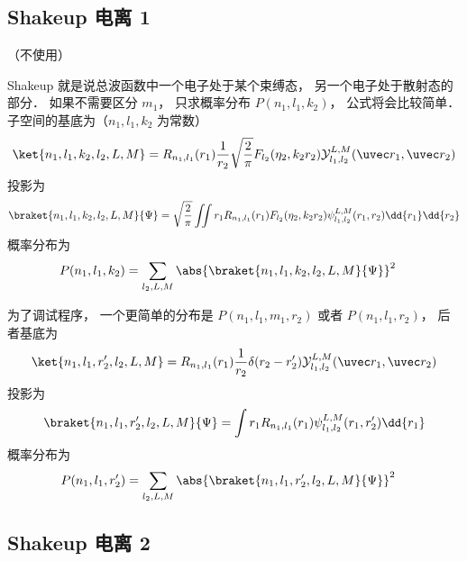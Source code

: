 \subsection{Shakeup 电离 1}
（不使用）

Shakeup 就是说总波函数中一个电子处于某个束缚态， 另一个电子处于散射态的部分． 如果不需要区分 $m_1$， 只求概率分布 $P(n_1, l_1, k_2)$， 公式将会比较简单． 子空间的基底为（$n_1, l_1, k_2$ 为常数）
\begin{equation}
\ket{n_1, l_1, k_2, l_2, L, M} = R_{n_1,l_1}(r_1) \frac{1}{r_2}\sqrt{\frac{2}{\pi}} F_{l_2}(\eta_2, k_2 r_2) \mathcal{Y}_{l_1, l_2}^{L, M}(\uvec r_1, \uvec r_2)
\end{equation}
投影为
\begin{equation}
\braket{n_1, l_1, k_2, l_2, L, M}{\Psi} = \sqrt{\frac{2}{\pi}} \iint r_1 R_{n_1,l_1}(r_1) F_{l_2}(\eta_2, k_2 r_2) \psi_{l_1, l_2}^{L, M}(r_1, r_2) \dd{r_1} \dd{r_2}
\end{equation}
概率分布为
\begin{equation}
\begin{aligned}
P(n_1, l_1, k_2) &= \sum_{l_2, L, M} \abs{\braket{n_1, l_1, k_2, l_2, L, M}{\Psi}}^2
\end{aligned}
\end{equation}

为了调试程序， 一个更简单的分布是 $P(n_1, l_1, m_1, r_2)$ 或者 $P(n_1, l_1, r_2)$， 后者基底为
\begin{equation}
\ket{n_1, l_1, r_2', l_2, L, M} = R_{n_1,l_1}(r_1) \frac{1}{r_2}\delta(r_2 - r_2') \mathcal{Y}_{l_1, l_2}^{L, M}(\uvec r_1, \uvec r_2)
\end{equation}
投影为
\begin{equation}
\braket{n_1, l_1, r_2', l_2, L, M}{\Psi} = \int r_1 R_{n_1,l_1}(r_1) \psi_{l_1, l_2}^{L, M}(r_1, r_2') \dd{r_1}
\end{equation}
概率分布为
\begin{equation}
\begin{aligned}
P(n_1, l_1, r_2') &= \sum_{l_2, L, M} \abs{\braket{n_1, l_1, r_2', l_2, L, M}{\Psi}}^2
\end{aligned}
\end{equation}

\subsection{Shakeup 电离 2}

